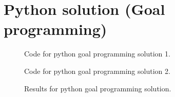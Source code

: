 \documentclass[a4paper,oneside,11pt]{book}
\begin{document}
\section{Python solution (Goal programming)}
\begin{figure}[H]
    \centering
    \caption{Code for python goal programming solution 1.}
\end{figure}
\begin{figure}[H]
    \centering
    \caption{Code for python goal programming solution 2.}
\end{figure}
\begin{figure}[H]
    \centering
    \caption{Results for python goal programming solution.}
\end{figure}
\end{document}
